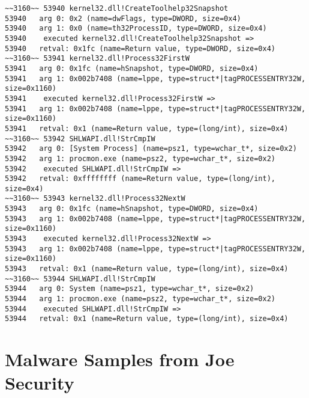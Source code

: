 \begin{lstlisting}[caption={\texttt{procmon.exe} search},captionpos=b]
~~3160~~ 53940 kernel32.dll!CreateToolhelp32Snapshot
53940 	arg 0: 0x2 (name=dwFlags, type=DWORD, size=0x4)
53940 	arg 1: 0x0 (name=th32ProcessID, type=DWORD, size=0x4)
53940    executed kernel32.dll!CreateToolhelp32Snapshot =>
53940 	retval: 0x1fc (name=Return value, type=DWORD, size=0x4)
~~3160~~ 53941 kernel32.dll!Process32FirstW
53941 	arg 0: 0x1fc (name=hSnapshot, type=DWORD, size=0x4)
53941 	arg 1: 0x002b7408 (name=lppe, type=struct*|tagPROCESSENTRY32W, size=0x1160)
53941    executed kernel32.dll!Process32FirstW =>
53941 	arg 1: 0x002b7408 (name=lppe, type=struct*|tagPROCESSENTRY32W, size=0x1160)
53941 	retval: 0x1 (name=Return value, type=(long/int), size=0x4)
~~3160~~ 53942 SHLWAPI.dll!StrCmpIW
53942 	arg 0: [System Process] (name=psz1, type=wchar_t*, size=0x2)
53942 	arg 1: procmon.exe (name=psz2, type=wchar_t*, size=0x2)
53942    executed SHLWAPI.dll!StrCmpIW =>
53942 	retval: 0xffffffff (name=Return value, type=(long/int), size=0x4)
~~3160~~ 53943 kernel32.dll!Process32NextW
53943 	arg 0: 0x1fc (name=hSnapshot, type=DWORD, size=0x4)
53943 	arg 1: 0x002b7408 (name=lppe, type=struct*|tagPROCESSENTRY32W, size=0x1160)
53943    executed kernel32.dll!Process32NextW =>
53943 	arg 1: 0x002b7408 (name=lppe, type=struct*|tagPROCESSENTRY32W, size=0x1160)
53943 	retval: 0x1 (name=Return value, type=(long/int), size=0x4)
~~3160~~ 53944 SHLWAPI.dll!StrCmpIW
53944 	arg 0: System (name=psz1, type=wchar_t*, size=0x2)
53944 	arg 1: procmon.exe (name=psz2, type=wchar_t*, size=0x2)
53944    executed SHLWAPI.dll!StrCmpIW =>
53944 	retval: 0x1 (name=Return value, type=(long/int), size=0x4)
\end{lstlisting}

\section{Malware Samples from Joe Security}

\iffalse
An overview of which is given by Table 4.3.
Showing each check hooked by BluePill and traced by BlueTracer.
Remember main image
\fi

